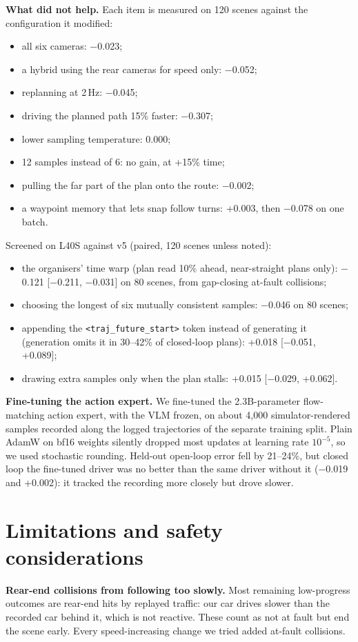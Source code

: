\documentclass{article}
\begin{document}
\textbf{What did not help.} Each item is measured on 120 scenes against the configuration it modified:
\begin{itemize}
\item all six cameras: $-$0.023;
\item a hybrid using the rear cameras for speed only: $-$0.052;
\item replanning at 2\,Hz: $-$0.045;
\item driving the planned path 15\% faster: $-$0.307;
\item lower sampling temperature: 0.000;
\item 12 samples instead of 6: no gain, at +15\% time;
\item pulling the far part of the plan onto the route: $-$0.002;
\item a waypoint memory that lets snap follow turns: +0.003, then $-$0.078 on one batch.
\end{itemize}
Screened on L40S against v5 (paired, 120 scenes unless noted):
\begin{itemize}
\item the organisers' time warp (plan read 10\% ahead, near-straight plans only): $-$0.121 [$-$0.211, $-$0.031] on 80
scenes, from gap-closing at-fault collisions;
\item choosing the longest of six mutually consistent samples: $-$0.046 on 80 scenes;
\item appending the \texttt{<traj\_future\_start>} token instead of generating it (generation omits it in 30--42\% of
closed-loop plans): +0.018 [$-$0.051, +0.089];
\item drawing extra samples only when the plan stalls: +0.015 [$-$0.029, +0.062].
\end{itemize}
\textbf{Fine-tuning the action expert.} We fine-tuned the 2.3B-parameter flow-matching action expert, with the VLM
frozen, on about 4{,}000 simulator-rendered samples recorded along the logged trajectories of the separate training
split. Plain AdamW on bf16 weights silently dropped most updates at learning rate $10^{-5}$, so we used stochastic
rounding. Held-out open-loop error fell by 21--24\%, but closed loop the fine-tuned driver was no better than the
same driver without it ($-$0.019 and +0.002): it tracked the recording more closely but drove slower.

\section{Limitations and safety considerations}
\textbf{Rear-end collisions from following too slowly.} Most remaining low-progress outcomes are rear-end hits by
replayed traffic: our car drives slower than the recorded car behind it, which is not reactive. These count as not at
fault but end the scene early. Every speed-increasing change we tried added at-fault collisions.
\end{document}
